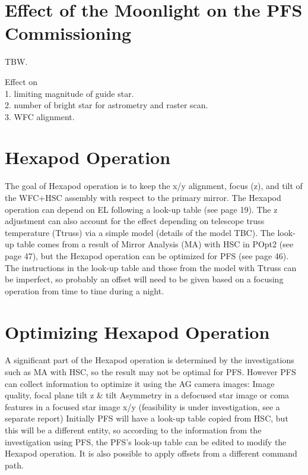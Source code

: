 \section{Effect of the Moonlight on the PFS Commissioning}
TBW.

Effect on \\
1.  limiting magnitude of guide star. \\
2. number of bright star for astrometry and raster scan. \\
3. WFC alignment.

\section{Hexapod Operation}\label{sec:Hexapod}

The goal of Hexapod operation is to keep the x/y alignment, focus (z), and tilt of the WFC+HSC assembly with respect to the primary mirror.
The Hexapod operation can depend on EL following a look-up table (see page 19). The z adjustment can also account for the effect depending on telescope truss temperature (Ttruss) via a simple model (details of the model TBC).
The look-up table comes from a result of Mirror Analysis (MA) with HSC in POpt2 (see page 47), but the Hexapod operation can be optimized for PFS (see page 46).
The instructions in the look-up table and those from the model with Ttruss can be imperfect, so probably an offset will need to be given based on a focusing operation from time to time during a night.

\section{Optimizing Hexapod Operation}

A significant part of the Hexapod operation is determined by the investigations such as MA with HSC, so the result may not be optimal for PFS.
However PFS can collect information to optimize it using the AG camera images:
Image quality, focal plane tilt z \& tilt
Asymmetry in a defocused star image or coma features in a focused star image  x/y (feasibility is under investigation, see a separate report)
Initially PFS will have a look-up table copied from HSC, but this will be a different entity, so according to the information from the investigation using PFS, the PFS's look-up table can be edited to modify the Hexapod operation. It is also possible to apply offsets from a different command path.


